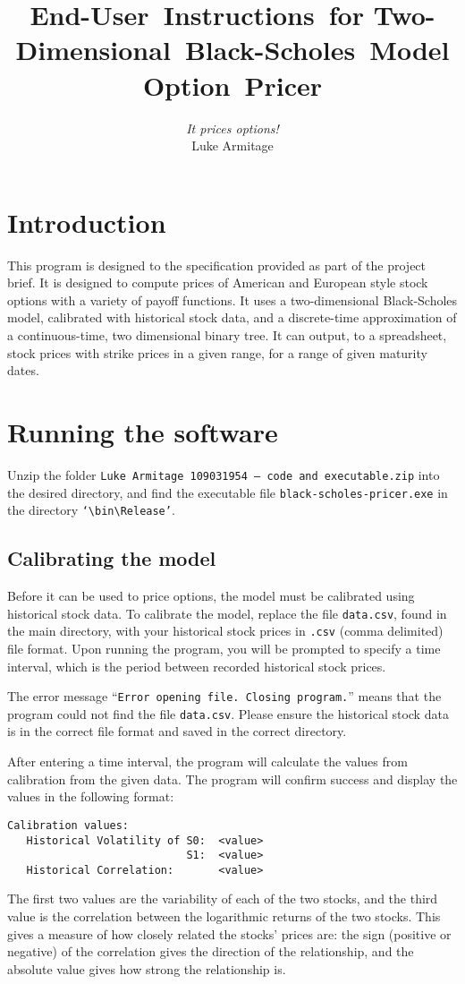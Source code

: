 \documentclass[12pt,a4paper]{article}
\author{\textit{It prices options!} 
		\\ Luke Armitage}
\date{}
\title{{\bfseries End-User~Instructions}~for Two-Dimensional~Black-Scholes~Model Option~Pricer}
\begin{document}
\maketitle

\section{Introduction}
This program is designed to the specification provided as part of the project brief. It is designed to compute prices of American and European style stock options with a variety of payoff functions. It uses a two-dimensional Black-Scholes model, calibrated with historical stock data, and a discrete-time approximation of a continuous-time, two dimensional binary tree. It can output, to a spreadsheet, stock prices with strike prices in a given range, for a range of given maturity dates. 




\section{Running the software}
Unzip the folder \texttt{Luke Armitage 109031954 -- code and executable.zip} into the desired directory, and find the executable file \texttt{black-scholes-pricer.exe} in the directory \texttt{`\textbackslash bin\textbackslash Release'}.


\subsection{Calibrating the model}
Before it can be used to price options, the model must be calibrated using historical stock data. 
To calibrate the model, replace the file \texttt{data.csv}, found in the main directory, with your historical stock prices in \texttt{.csv} (comma delimited) file format. Upon running the program, you will be prompted to specify a time interval, which is the period between recorded historical stock prices. 

The error message ``\texttt{Error opening file. Closing program.}'' means that the program could not find the file \texttt{data.csv}. Please ensure the historical stock data is in the correct file format and saved in the correct directory.

After entering a time interval, the program will calculate the values from calibration from the given data. The program will confirm success and display the values in the following format:
\begin{lstlisting}
Calibration values:
   Historical Volatility of S0:  <value>
                            S1:  <value>
   Historical Correlation:       <value>
\end{lstlisting}
The first two values are the variability of each of the two stocks, and the third value is the correlation between the logarithmic returns of the two stocks. This gives a measure of how closely related the stocks' prices are: the sign (positive or negative) of the correlation gives the direction of the relationship, and the absolute value gives how strong the relationship is.
\end{document}
